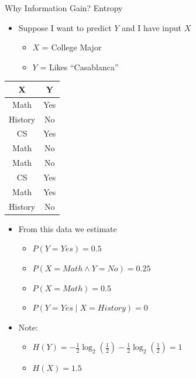 \begin{frame}[allowframebreaks]{Why Information Gain? Entropy}

\begin{itemize}
  \item Suppose I want to predict $Y$ and I have input $X$
  \begin{itemize}
    \item $X$ = College Major
    \item $Y$ = Likes “Casablanca”
  \end{itemize}
\end{itemize}

\begin{center}
\begin{tabular}{|c|c|}
\hline
X & Y \\
\hline
Math & Yes \\
History & No \\
CS & Yes \\
Math & No \\
Math & No \\
CS & Yes \\
Math & Yes \\
History & No \\
\hline
\end{tabular}
\end{center}

\begin{itemize}
  \item From this data we estimate
  \begin{itemize}
    \item $P(Y = Yes) = 0.5$
    \item $P(X = Math \land Y = No) = 0.25$
    \item $P(X = Math) = 0.5$
    \item $P(Y = Yes \mid X = History) = 0$
  \end{itemize}
  \item Note:
  \begin{itemize}
    \item $H(Y) = -\frac{1}{2} \log_2(\frac{1}{2}) - \frac{1}{2} \log_2(\frac{1}{2}) = 1$
    \item $H(X) = 1.5$
  \end{itemize}
\end{itemize}

\end{frame}


